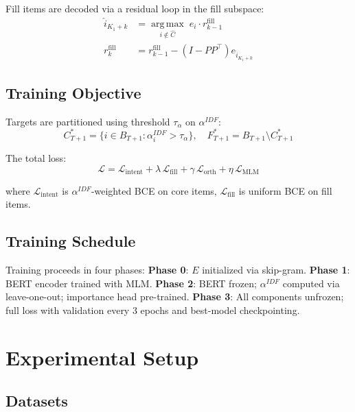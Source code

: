 \documentclass[conference]{IEEEtran}
\begin{document}
Fill items are decoded via a residual loop in the fill subspace:
\begin{align}
\hat{i}_{K_1+k} &= \operatorname*{arg\,max}_{i \notin \hat{C}}\; e_i \cdot r_{k-1}^{\text{fill}} \\
r_k^{\text{fill}} &= r_{k-1}^{\text{fill}} - (I - PP^\top) e_{\hat{i}_{K_1+k}}
\end{align}

\subsection{Training Objective}
Targets are partitioned using threshold $\tau_\alpha$ on $\alpha^{IDF}$:
\begin{equation}
C^*_{T+1} = \{i \in B_{T+1} : \alpha_i^{IDF} > \tau_\alpha\},\quad
F^*_{T+1} = B_{T+1} \setminus C^*_{T+1}
\end{equation}

The total loss:
\begin{equation}
\mathcal{L} = \mathcal{L}_{\text{intent}}
            + \lambda\,\mathcal{L}_{\text{fill}}
            + \gamma\,\mathcal{L}_{\text{orth}}
            + \eta\,\mathcal{L}_{\text{MLM}}
\end{equation}

where $\mathcal{L}_{\text{intent}}$ is $\alpha^{IDF}$-weighted BCE on core items, $\mathcal{L}_{\text{fill}}$ is uniform BCE on fill items.

\subsection{Training Schedule}
Training proceeds in four phases:
\textbf{Phase 0}: $E$ initialized via skip-gram.
\textbf{Phase 1}: BERT encoder trained with MLM.
\textbf{Phase 2}: BERT frozen; $\alpha^{IDF}$ computed via leave-one-out; importance head pre-trained.
\textbf{Phase 3}: All components unfrozen; full loss with validation every 3 epochs and best-model checkpointing.


\section{Experimental Setup}
\label{sec:experiments}

\subsection{Datasets}
\end{document}
